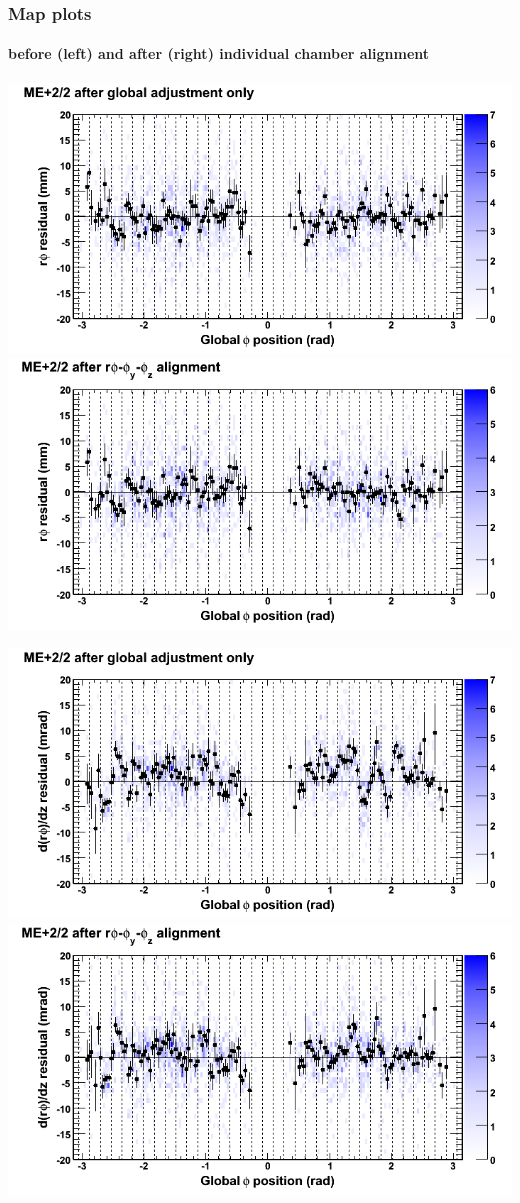 \documentclass[compress]{beamer}
\begin{document}
\begin{frame}
\frametitle{Map plots}
\framesubtitle{before (left) and after (right) individual chamber alignment}
\includegraphics[width=0.5\linewidth]{ringmapplots_3dof/before_CSCvsphi_mep22_x.png} \includegraphics[width=0.5\linewidth]{ringmapplots_3dof/after_CSCvsphi_mep22_x.png}

\includegraphics[width=0.5\linewidth]{ringmapplots_3dof/before_CSCvsphi_mep22_dxdz.png} \includegraphics[width=0.5\linewidth]{ringmapplots_3dof/after_CSCvsphi_mep22_dxdz.png}
\end{frame}
\end{document}
